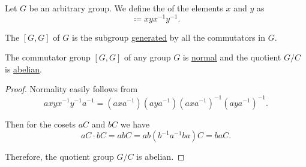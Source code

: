 \begin{definition}\label{def:group_commutator}
  Let \( G \) be an arbitrary group. We define the  of the elements \( x \) and \( y \) as
  \begin{equation*}
    [x, y] \coloneqq xyx^{-1}y^{-1}.
  \end{equation*}

  The  \( [G, G] \) of \( G \) is the subgroup \hyperref[def:group/submodel]{generated} by all the commutators in \( G \).
\end{definition}

\begin{proposition}\label{thm:quotient_by_commutator_subgroup}
  The commutator group \( [G, G] \) of any group \( G \) is \hyperref[def:normal_subgroup]{normal} and the quotient \( G / C \) is \hyperref[def:abelian_group]{abelian}.
\end{proposition}
\begin{proof}
  Normality easily follows from
  \begin{equation*}
    a xyx^{-1}y^{-1} a^{-1}
    =
    (a x a^{-1}) (a y a^{-1}) (a x a^{-1})^{-1} (a y a^{-1})^{-1}.
  \end{equation*}

  Then for the cosets \( a C \) and \( b C \) we have
  \begin{equation*}
    a C \cdot b C
    =
    a b C
    =
    a b (b^{-1} a^{-1} b a) C
    =
    b a C.
  \end{equation*}

  Therefore, the quotient group \( G / C \) is abelian.
\end{proof}

